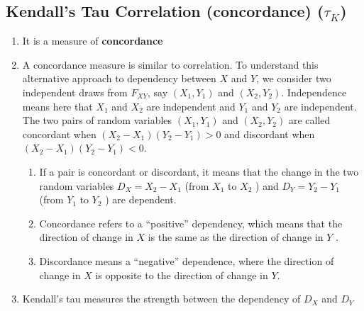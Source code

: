 \subsection{Kendall’s Tau Correlation (concordance) ($\tau_K$)}


\begin{enumerate}
    \item It is a measure of \textbf{concordance}
    \hfill \cite{statistics/book/Statistics-for-Data-Scientists/Maurits-Kaptein}

    \item
    \begin{definition}
        A concordance measure is similar to correlation.
        To understand this alternative approach to dependency between $X$ and $Y$, we consider two independent draws from $F _{X Y}$, say $(X_1, Y_1)$ and $(X_2, Y_2)$.
        Independence means here that $X_1$ and $X_2$ are independent and $Y_1$ and $Y_2$ are independent.
        The two pairs of random variables $(X_1, Y_1)$ and $(X_2, Y_2)$ are called concordant when $(X_2 - X_1)(Y_2 - Y_1) > 0$ and discordant when $(X_2 - X_1)(Y_2 - Y_1) < 0$.
        \hfill \cite{statistics/book/Statistics-for-Data-Scientists/Maurits-Kaptein}
    \end{definition}
    \begin{enumerate}
        \item If a pair is concordant or discordant, it means that the change in the two random variables $D_X = X_2 - X_1$ (from $X_1$ to $X_2$ ) and $D_Y = Y_2 - Y_1$ (from $Y_1$ to $Y_2$ ) are dependent.
        \hfill \cite{statistics/book/Statistics-for-Data-Scientists/Maurits-Kaptein}

        \item Concordance refers to a “positive” dependency, which means that the direction of change in $X$ is the same as the direction of change in $Y$ .
        \hfill \cite{statistics/book/Statistics-for-Data-Scientists/Maurits-Kaptein}

        \item Discordance means a “negative” dependence, where the direction of change in $X$ is opposite to the direction of change in $Y$.
        \hfill \cite{statistics/book/Statistics-for-Data-Scientists/Maurits-Kaptein}
    \end{enumerate}

    \item Kendall’s tau measures the strength between the dependency of $D_X$ and $D_Y$
    \hfill \cite{statistics/book/Statistics-for-Data-Scientists/Maurits-Kaptein}


\end{enumerate}
